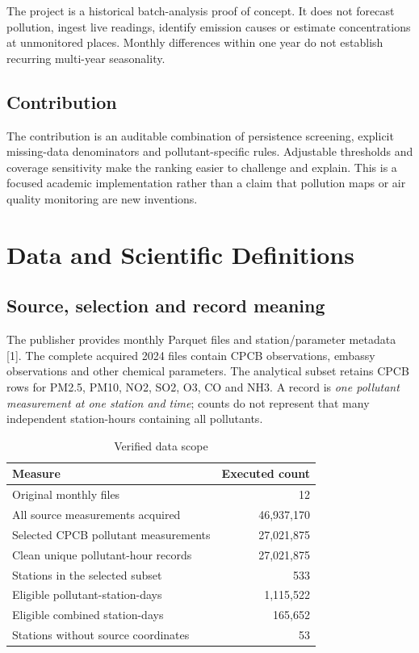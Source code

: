 \documentclass[11pt,a4paper]{article}
\begin{document}
The project is a historical batch-analysis proof of concept. It does not forecast pollution, ingest live readings, identify emission causes or estimate concentrations at unmonitored places. Monthly differences within one year do not establish recurring multi-year seasonality.

\subsection{Contribution}
The contribution is an auditable combination of persistence screening, explicit missing-data denominators and pollutant-specific rules. Adjustable thresholds and coverage sensitivity make the ranking easier to challenge and explain. This is a focused academic implementation rather than a claim that pollution maps or air quality monitoring are new inventions.

\newpage
\section{Data and Scientific Definitions}
\subsection{Source, selection and record meaning}
The publisher provides monthly Parquet files and station/parameter metadata [1]. The complete acquired 2024 files contain CPCB observations, embassy observations and other chemical parameters. The analytical subset retains CPCB rows for PM2.5, PM10, NO2, SO2, O3, CO and NH3. A record is \emph{one pollutant measurement at one station and time}; counts do not represent that many independent station-hours containing all pollutants.

\begin{table}[H]\centering\caption{Verified data scope}
\begin{tabularx}{\linewidth}{Yr}\toprule
Measure & Executed count\\\midrule
Original monthly files & 12\\
All source measurements acquired & 46,937,170\\
Selected CPCB pollutant measurements & 27,021,875\\
Clean unique pollutant-hour records & 27,021,875\\
Stations in the selected subset & 533\\
Eligible pollutant-station-days & 1,115,522\\
Eligible combined station-days & 165,652\\
Stations without source coordinates & 53\\\bottomrule
\end{tabularx}\end{table}
\end{document}
